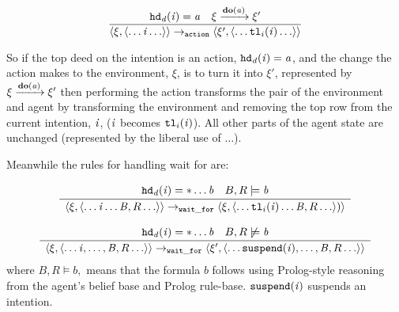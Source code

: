 \documentclass{blue-book}
\begin{document}
\begin{equation}
  \frac{
    \mathit{{\tt hd}_d}(\mathit{i}) = \mathit{a}
\quad \xi \xrightarrow{\mathrm{\mathbf{do}}(\mathit{a})} \xi' 
}{
\langle \xi, \langle \ldots \mathit{i} \ldots \rangle \rangle \rightarrow_{\tt action} 
\langle \xi', \langle \ldots {\tt tl}_i(\mathit{i})  \ldots \rangle \rangle
}
\label{eq:action}
\end{equation}

So if the top deed on the intention is an action, $\mathit{{\tt hd}_d}(\mathit{i}) = \mathit{a}$, and the change the action makes to the environment, $\xi$, is to turn it into $\xi'$, represented by $ \xi \xrightarrow{\mathrm{\mathbf{do}}(\mathit{a})} \xi' $ then performing the action transforms the pair of the environment and agent by transforming the environment and removing the top row from the current intention, $\mathit{i}$, ($\mathit{i}$ becomes ${\tt tl}_i(\mathit{i})$).  All other parts of the agent state are unchanged (represented by the liberal use of $\ldots$).

Meanwhile the rules for handling wait for are:

\begin{equation}
\frac{\begin{array}{c}
\mathit{{\tt hd}_d}(\mathit{i}) = *\ldots{\ensuremath{\mathit{b}}}
\quad B, R \models \mathit{b}
\end{array}
}{
\begin{array}{c}
  \langle \xi, \langle \ldots \mathit{i} \ldots \mathit{B}, R \ldots \rangle \rangle
\rightarrow_{\tt wait\_for} 
\langle \xi, \langle \ldots
{\tt tl}_i(\mathit{i})
\ldots \mathit{B}, R \ldots \rangle ) \rangle
\end{array}
}
\label{eq:waitfor1}
\end{equation}

\begin{equation}
\frac{
\begin{array}{c}
  \mathit{{\tt hd}_d}(\mathit{i}) = *\ldots{\ensuremath{\mathit{b}}}
\quad B, R \not \models \mathit{b}
\end{array}
}{
\begin{array}{c}
  \langle \xi, \langle \ldots \mathit{i}, \ldots, \mathit{B}, R \ldots \rangle \rangle
\rightarrow_{\tt wait\_for} 
\langle \xi', \langle \ldots
{\tt suspend}(\mathit{i}),
\ldots, \mathit{B}, R \ldots
\rangle  \rangle
\label{eq:waitfor2}
\end{array}
}
\end{equation}
where $B, R \models b,$ means that the
formula $b$ follows using Prolog-style reasoning from the agent's belief base and Prolog rule-base.  ${\tt suspend}(\mathit{i})$ suspends an intention. 
\end{document}
